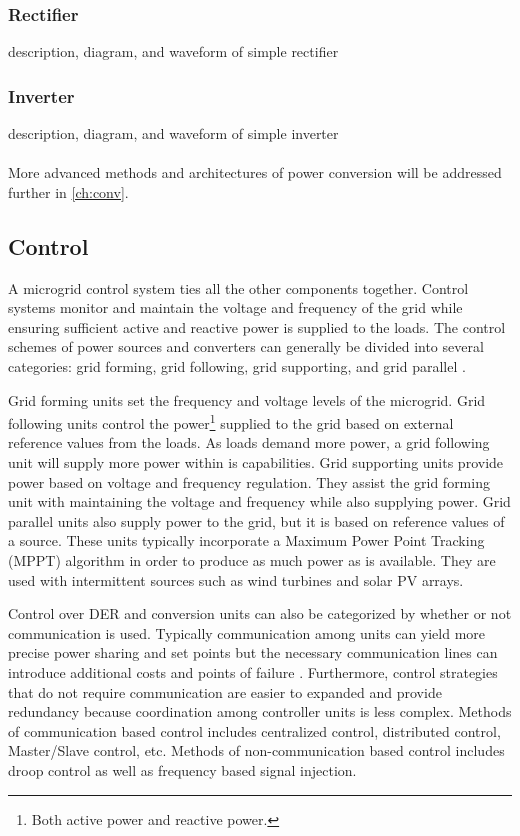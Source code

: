 \subsubsection{Rectifier}
description, diagram, and waveform of simple rectifier

\subsubsection{Inverter}
description, diagram, and waveform of simple inverter

\paragraph{}
More advanced methods and architectures of power conversion will be addressed further in \autoref{ch:conv}.

\subsection{Control}
A microgrid control system ties all the other components together. Control systems monitor and maintain the voltage and frequency of the grid while ensuring sufficient active and reactive power is supplied to the loads. The control schemes of power sources and converters can generally be divided into several categories: grid forming, grid following, grid supporting, and grid parallel \cite{Ortjohann2012, Engler, Strauss2003}. 

Grid forming units set the frequency and voltage levels of the microgrid. Grid following units control the power\footnote{Both active power and reactive power.} supplied to the grid based on external reference values from the loads. As loads demand more power, a grid following unit will supply more power within is capabilities. Grid supporting units provide power based on voltage and frequency regulation. They assist the grid forming unit with maintaining the voltage and frequency while also supplying power. Grid parallel units also supply power to the grid, but it is based on reference values of a source. These units typically incorporate a Maximum Power Point Tracking (MPPT) algorithm in order to produce as much power as is available. They are used with intermittent sources such as wind turbines and solar PV arrays. 

Control over DER and conversion units can also be categorized by whether or not communication is used. Typically communication among units can yield more precise power sharing and set points but the necessary communication lines can introduce additional costs and points of failure \cite{Vandoorn2013}. Furthermore, control strategies that do not require communication are easier to expanded and provide redundancy because coordination among controller units is less complex. Methods of communication based control includes centralized control, distributed control, Master/Slave control, etc. Methods of non-communication based control includes droop control as well as frequency based signal injection.


